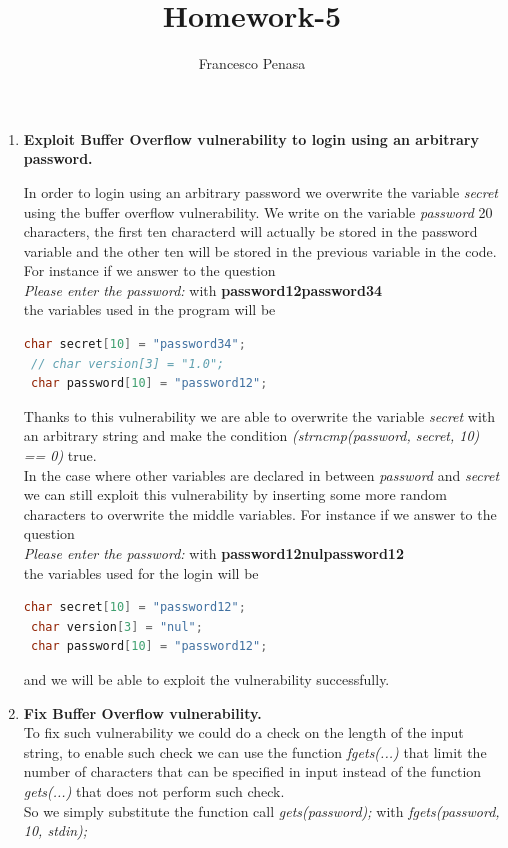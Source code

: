 \documentclass[11pt]{article}
\begin{document}
\author{Francesco Penasa}
\title{Homework-5}
\maketitle

\medskip

\begin{enumerate}

\item
\textbf{Exploit Buffer Overflow vulnerability to login using an arbitrary password.}

In order to login using an arbitrary password we overwrite the variable \textit{secret} using the buffer overflow vulnerability.
We write on the variable \textit{password} 20 characters, the first ten characterd will actually be stored in the password variable and the other ten will be stored in the previous variable in the code. For instance if we answer to the question \\ 
\textit{Please enter the password:} with \textbf{password12password34} \\
the variables used in the program will be
\begin{lstlisting}[language=C]
 char secret[10] = "password34";
 // char version[3] = "1.0";
 char password[10] = "password12";
\end{lstlisting}
Thanks to this vulnerability we are able to overwrite the variable \textit{secret} with an arbitrary string and make the condition \textit{(strncmp(password, secret, 10) == 0)} true. \\
In the case where other variables are declared in between \textit{password} and \textit{secret} we can still exploit this vulnerability by inserting some more random characters to overwrite the middle variables.
For instance if we answer to the question \\ 
\textit{Please enter the password:} with \textbf{password12nulpassword12} \\
the variables used for the login will be
\begin{lstlisting}[language=C]
 char secret[10] = "password12";
 char version[3] = "nul";
 char password[10] = "password12";
\end{lstlisting}
and we will be able to exploit the vulnerability successfully.

\item
\textbf{Fix Buffer Overflow vulnerability.} \\
To fix such vulnerability we could do a check on the length of the input string, to enable such check we can use the function \textit{fgets(...)} that limit the number of characters that can be specified in input instead of the function \textit{gets(...)} that does not perform such check. \\
So we simply substitute the function call \textit{gets(password);} with  \textit{fgets(password, 10, stdin);}\\


\end{enumerate}
\end{document}

